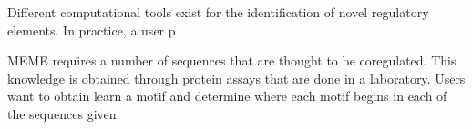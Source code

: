 Different computational tools exist for the identification of novel regulatory elements. In practice, a user p

MEME requires a number of sequences that are thought to be coregulated. This knowledge is obtained through protein assays that are done in a laboratory. Users want to obtain learn a motif and determine where each motif begins in each of the sequences given. 